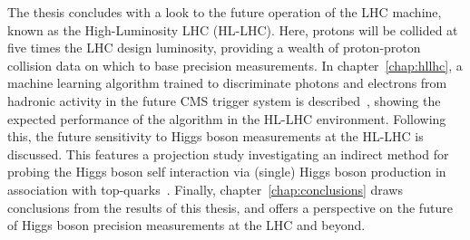 The thesis concludes with a look to the future operation of the LHC machine, known as the High-Luminosity LHC (HL-LHC). Here, protons will be collided at five times the LHC design luminosity, providing a wealth of proton-proton collision data on which to base precision measurements. In chapter~\ref{chap:hllhc}, a machine learning algorithm trained to discriminate photons and electrons from hadronic activity in the future CMS trigger system is described~\cite{CERN-LHCC-2020-004}, showing the expected performance of the algorithm in the HL-LHC environment. Following this, the future sensitivity to Higgs boson measurements at the HL-LHC is discussed. This features a projection study investigating an indirect method for probing the Higgs boson self interaction via (single) Higgs boson production in association with top-quarks~\cite{CMS-PAS-FTR-18-020}. Finally, chapter~\ref{chap:conclusions} draws conclusions from the results of this thesis, and offers a perspective on the future of Higgs boson precision measurements at the LHC and beyond.
